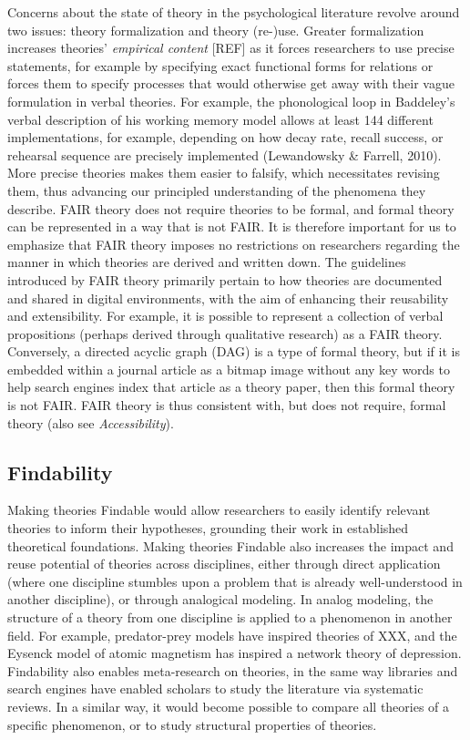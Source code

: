 \documentclass[
  man,floatsintext]{apa6}
\begin{document}
Concerns about the state of theory in the psychological literature revolve around two issues: theory formalization and theory (re-)use.
Greater formalization increases theories' \emph{empirical content} {[}REF{]} as it forces researchers to use precise statements, for example by specifying exact functional forms for relations or forces them to specify processes that would otherwise get away with their vague formulation in verbal theories.
For example, the phonological loop in Baddeley's verbal description of his working memory model allows at least 144 different implementations, for example, depending on how decay rate, recall success, or rehearsal sequence are precisely implemented (Lewandowsky \& Farrell, 2010).
More precise theories makes them easier to falsify,
which necessitates revising them,
thus advancing our principled understanding of the phenomena they describe.
FAIR theory does not require theories to be formal,
and formal theory can be represented in a way that is not FAIR.
It is therefore important for us to emphasize that FAIR theory imposes no restrictions on researchers regarding the manner in which theories are derived and written down.
The guidelines introduced by FAIR theory primarily pertain to how theories are documented and shared in digital environments, with the aim of enhancing their reusability and extensibility.
For example, it is possible to represent a collection of verbal propositions (perhaps derived through qualitative research) as a FAIR theory.
Conversely, a directed acyclic graph (DAG) is a type of formal theory,
but if it is embedded within a journal article as a bitmap image without any key words to help search engines index that article as a theory paper,
then this formal theory is not FAIR.
FAIR theory is thus consistent with, but does not require, formal theory (also see \emph{Accessibility}).

\subsection{Findability}\label{findability}

Making theories Findable would allow researchers to easily identify relevant theories to inform their hypotheses,
grounding their work in established theoretical foundations.
Making theories Findable also increases the impact and reuse potential of theories across disciplines,
either through direct application (where one discipline stumbles upon a problem that is already well-understood in another discipline),
or through analogical modeling.
In analog modeling, the structure of a theory from one discipline is applied to a phenomenon in another field.
For example, predator-prey models have inspired theories of XXX, and the Eysenck model of atomic magnetism has inspired a network theory of depression.
Findability also enables meta-research on theories,
in the same way libraries and search engines have enabled scholars to study the literature via systematic reviews.
In a similar way, it would become possible to compare all theories of a specific phenomenon,
or to study structural properties of theories.
\end{document}
